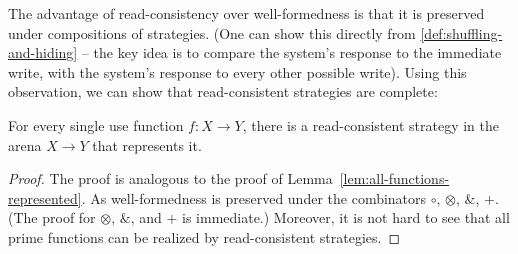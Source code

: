 \documentclass[10pt,a4paper]{amsart}
\numberwithin{equation}{section}
\theoremstyle{plain}
\begin{document}
The advantage of read-consistency over well-formedness is that it is preserved under compositions of strategies. 
(One can show this directly from \ref{def:shuffling-and-hiding} -- the key idea is to compare the system's response to the immediate write,
with the system's response to every other possible write). Using this observation, we can show that read-consistent strategies are complete:
\begin{lemma}\label{lem:all-read-consistent}
    For every single use function $f : X \to Y$, there is a read-consistent strategy in the arena $X \to Y$ that represents it. 
\end{lemma}
\begin{proof}
    The proof is analogous to the proof of Lemma~\ref{lem:all-functions-represented}. As well-formedness is preserved
    under the combinators $\circ$, $\otimes$, $\&$, $+$. (The proof for $\otimes$, $\&$, and $+$ is immediate.)
    Moreover, it is not hard to see that all prime functions can be realized by read-consistent strategies. 
\end{proof}
\end{document}

